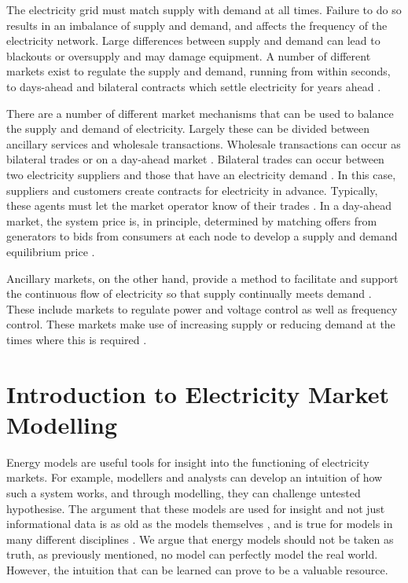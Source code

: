 The electricity grid must match supply with demand at all times. Failure to do so results in an imbalance of supply and demand, and affects the frequency of the electricity network. Large differences between supply and demand can lead to blackouts or oversupply and may damage equipment. A number of different markets exist to regulate the supply and demand, running from within seconds, to days-ahead and bilateral contracts which settle electricity for years ahead \cite{conejo2010electricity}.

There are a number of different market mechanisms that can be used to balance the supply and demand of electricity. Largely these can be divided between ancillary services and wholesale transactions. Wholesale transactions can occur as bilateral trades or on a day-ahead market \cite{conejo2010electricity}. Bilateral trades can occur between two electricity suppliers and those that have an electricity demand \cite{conejo2010electricity}. In this case, suppliers and customers create contracts for electricity in advance. Typically, these agents must let the market operator know of their trades \cite{conejo2010electricity}. In a day-ahead market, the system price is, in principle, determined by matching offers from generators to bids from consumers at each node to develop a supply and demand equilibrium price \cite{conejo2010electricity}. 

Ancillary markets, on the other hand, provide a method to facilitate and support the continuous flow of electricity so that supply continually meets demand \cite{conejo2010electricity}. These include markets to regulate power and voltage control as well as frequency control. These markets make use of increasing supply or reducing demand at the times where this is required \cite{conejo2010electricity}. 







\section{Introduction to Electricity Market Modelling}
\label{sec:intro:elecmarketsmodelling}


Energy models are useful tools for insight into the functioning of electricity markets. For example, modellers and analysts can develop an intuition of how such a system works, and through modelling, they can challenge untested hypothesise. The argument that these models are used for insight and not just informational data is as old as the models themselves \cite{Huntington1982, Pfenninger2014b}, and is true for models in many different disciplines \cite{Geoffrion1976}. We argue that energy models should not be taken as truth, as previously mentioned, no model can perfectly model the real world. However, the intuition that can be learned can prove to be a valuable resource.

